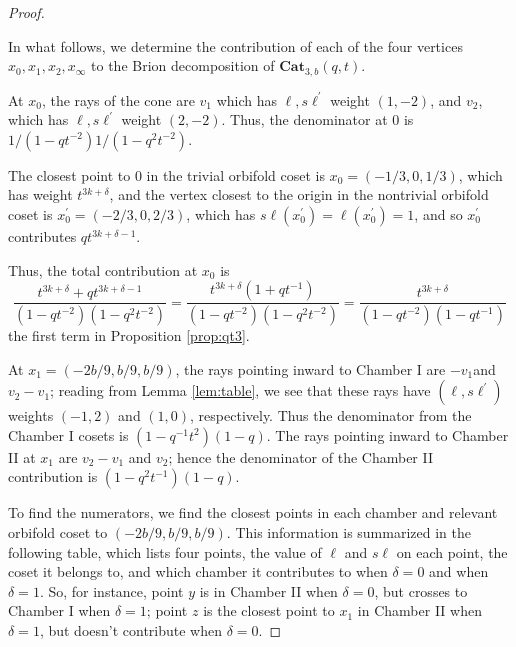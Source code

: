 \documentclass{amsart}[12pt]
\theoremstyle{definition}
\newcommand{\Cat}{\mathbf{Cat}}
\newcommand{\sk}{s\ell}
\begin{document}
\begin{proof}
\begin{center}




\end{center}


In what follows, we determine the contribution of each of the four vertices $x_0,x_1,x_2,x_\infty$ to the Brion decomposition of $\Cat_{3,b}(q,t)$.



At $x_0$, the rays of the cone are $v_1$ which has $\ell, \sk^\prime$ weight $(1, -2)$, and $v_2$, which has $\ell, \sk^\prime$ weight $(2,-2)$.  Thus, the denominator at $0$ is $1/(1-qt^{-2})1/(1-q^2t^{-2})$.

The closest point to $0$ in the trivial orbifold coset is $x_0=(-1/3,0,1/3)$, which has weight $t^{3k+\delta}$, and the vertex closest to the origin in the nontrivial orbifold coset is $x_0^\prime=(-2/3,0,2/3)$, which has $\sk(x_0^\prime)=\ell(x_0^\prime)=1$, and so $x_0^\prime$ contributes $qt^{3k+\delta-1}$.

Thus, the total contribution at $x_0$ is
$$\frac{t^{3k+\delta}+qt^{3k+\delta-1}}{(1-qt^{-2})(1-q^2t^{-2})}=\frac{t^{3k+\delta}(1+qt^{-1})}{(1-qt^{-2})(1-q^2t^{-2})}
=\frac{t^{3k+\delta}}{(1-qt^{-2})(1-qt^{-1})}$$
the first term in Proposition \ref{prop:qt3}.

At $x_1=(-2b/9, b/9, b/9)$, the rays pointing inward to Chamber I are $-v_1$and $v_2-v_1$; reading from Lemma \ref{lem:table}, we see that these rays have $(\ell, \sk^\prime)$ weights $(-1, 2)$ and $(1, 0)$, respectively.  Thus the denominator from the Chamber I cosets is $(1-q^{-1}t^2)(1-q)$.  The rays pointing inward to Chamber II at $x_1$ are $v_2-v_1$ and $v_2$; hence the denominator of the Chamber II contribution is $(1-q^2t^{-1})(1-q)$.

To find the numerators, we find the closest points in each chamber and relevant orbifold coset to $(-2b/9, b/9, b/9)$.  This information is summarized in the following table, which lists four points, the value of $\ell$ and $\sk$ on each point, the coset it belongs to, and which chamber it contributes to when $\delta=0$ and when $\delta=1$.  So, for instance, point $y$ is in Chamber II when $\delta=0$, but crosses to Chamber I when $\delta=1$; point $z$ is the closest point to $x_1$ in Chamber II when $\delta=1$, but doesn't contribute when $\delta=0$.


\end{proof}
\end{document}
